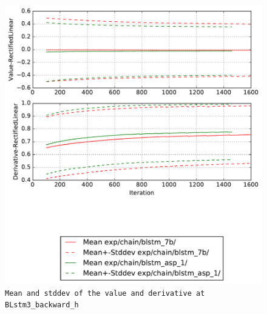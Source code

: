 \documentclass[prl,10pt,twocolumn]{revtex4}
\begin{document}
\newpage
\begin{figure}[h]
  \begin{center}
    \caption{\texttt{Mean and stddev of the value and derivative at BLstm3\_backward\_h}}
    \includegraphics[width=\textwidth]{exp/chain/blstm_7b/report/nonlinstats_BLstm3_backward_h.pdf}
  \end{center}
\end{figure}
\clearpage
\end{document}
